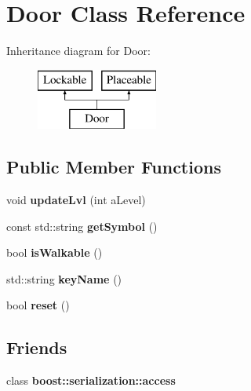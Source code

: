 \hypertarget{class_door}{}\section{Door Class Reference}
\label{class_door}
Inheritance diagram for Door\+:\begin{figure}[H]
\begin{center}
\leavevmode
\includegraphics[height=2.000000cm]{class_door}
\end{center}
\end{figure}
\subsection*{Public Member Functions}
\begin{DoxyCompactItemize}
\item 
\hypertarget{class_door_a60ffd182da3a5663b0a1215117b8a3fd}{}\label{class_door_a60ffd182da3a5663b0a1215117b8a3fd} 
void {\bfseries update\+Lvl} (int a\+Level)
\item 
\hypertarget{class_door_aab12aff84fda58e714bd80184c5976d1}{}\label{class_door_aab12aff84fda58e714bd80184c5976d1} 
const std\+::string {\bfseries get\+Symbol} ()
\item 
\hypertarget{class_door_a7736b689448b00c26407c20c8826777f}{}\label{class_door_a7736b689448b00c26407c20c8826777f} 
bool {\bfseries is\+Walkable} ()
\item 
\hypertarget{class_door_a8676c57077d910a740a786ba1885f492}{}\label{class_door_a8676c57077d910a740a786ba1885f492} 
std\+::string {\bfseries key\+Name} ()
\item 
\hypertarget{class_door_a739d0097860e447091024c1dbe57ca55}{}\label{class_door_a739d0097860e447091024c1dbe57ca55} 
bool {\bfseries reset} ()
\end{DoxyCompactItemize}
\subsection*{Friends}
\begin{DoxyCompactItemize}
\item 
\hypertarget{class_door_ac98d07dd8f7b70e16ccb9a01abf56b9c}{}\label{class_door_ac98d07dd8f7b70e16ccb9a01abf56b9c} 
class {\bfseries boost\+::serialization\+::access}
\end{DoxyCompactItemize}
